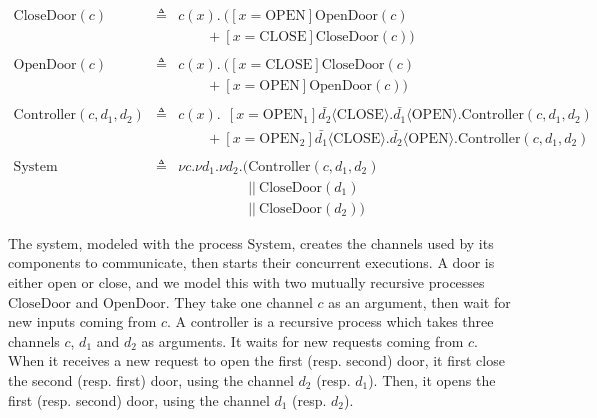 \begin{example}
  \[
    \begin{array}{rcl}
      \mathrm{CloseDoor}(c)
      & \triangleq
      & c(x) . \ ([x = \mathrm{OPEN}] \mathrm{OpenDoor}(c) \\
      &
      & \qquad + [x = \mathrm{CLOSE}] \mathrm{CloseDoor}(c)) \\
      & & \\
      \mathrm{OpenDoor}(c)
      & \triangleq
      & c(x) . \ ([x = \mathrm{CLOSE}] \mathrm{CloseDoor}(c) \\
      &
      & \qquad + [x = \mathrm{OPEN}] \mathrm{OpenDoor}(c)) \\
      & & \\
      \mathrm{Controller}(c, d_1, d_2)
      & \triangleq
      & c(x). \ \ [x = \mathrm{OPEN}_1] \bar{d_2} \langle
        \mathrm{CLOSE} \rangle . \bar{d_1} \langle \mathrm{OPEN} \rangle . \mathrm{Controller}(c, d_1, d_2) \\
      &
      & \qquad + [x = \mathrm{OPEN}_2] \bar{d_1} \langle
        \mathrm{CLOSE} \rangle . \bar{d_2} \langle \mathrm{OPEN} \rangle. \mathrm{Controller}(c, d_1, d_2) \\
      & & \\
      \mathrm{System}
      & \triangleq
      & \nu c. \nu d_1. \nu d_2. (\mathrm{Controller}(c, d_1, d_2) \\
      &
      & \quad\qquad\qquad ||\ \mathrm{CloseDoor}(d_1) \\
      &
      & \quad\qquad\qquad ||\ \mathrm{CloseDoor}(d_2))
    \end{array}
  \]

  The system, modeled with the process \( \mathrm{System} \), creates the
  channels used by its components to communicate, then starts their concurrent
  executions.
  A door is either open or close, and we model this with two mutually recursive
  processes \( \mathrm{CloseDoor} \) and \( \mathrm{OpenDoor} \).
  They take one channel \( c \) as an argument, then wait for new inputs coming
  from \( c \).
  A controller is a recursive process which takes three channels \( c \),
  \( d_1 \) and \( d_2 \) as arguments.
  It waits for new requests coming from \( c \).
  When it receives a new request to open the first (resp. second) door, it first
  close the second (resp. first) door, using the channel \( d_2 \) (resp.
  \( d_1 \)).
  Then, it opens the first (resp. second) door, using the channel \( d_1 \)
  (resp. \( d_2 \)).
\end{example}

